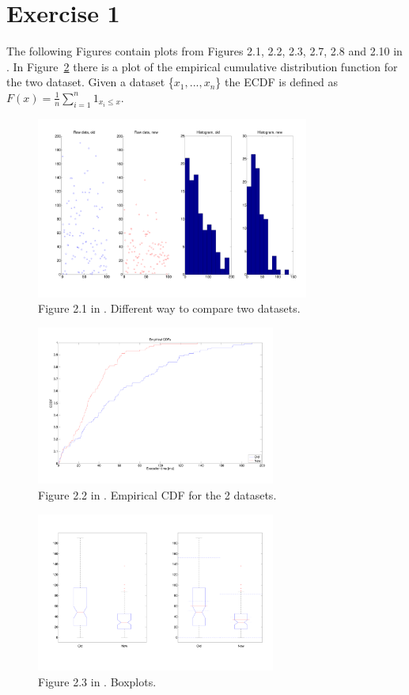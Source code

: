 \documentclass[10pt]{article}
\begin{document}
\section{Exercise 1}
The following Figures contain plots from Figures 2.1, 2.2, 2.3, 2.7, 2.8 and 2.10 in \cite{leb}. In Figure~\ref{fig:22} there is a plot of the empirical cumulative distribution function for the two dataset. Given a dataset \{$x_1, ... , x_n$\} the ECDF is defined as $F(x)=\frac{1}{n}\sum_{i=1}^n1_{x_i \le x}$.


\begin{figure}[h!]
  \centering
  \includegraphics[width=0.8\textwidth]{images/hw1_1_21}
  \caption{Figure 2.1 in \cite{leb}. Different way to compare two datasets.}
  \label{fig:21}
\end{figure}


\begin{figure}[h!]
  \centering
  \includegraphics[width=0.7\textwidth]{images/hw1_1_22}
  \caption{Figure 2.2 in \cite{leb}. Empirical CDF for the 2 datasets.}
  \label{fig:22}
\end{figure}

\begin{figure}[h!]
  \centering
  \includegraphics[width=0.7\textwidth]{images/hw1_1_23}
  \caption{Figure 2.3 in \cite{leb}. Boxplots.}
  \label{fig:23}
\end{figure}
\end{document}
